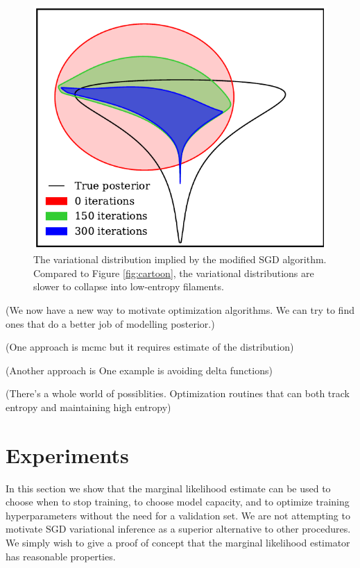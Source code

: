 \documentclass[]{article}
\begin{document}
\begin{figure}[h]
\vskip 0.2in
\begin{center}
\includegraphics[width=\columnwidth]{../experiments/2015_03_02_funnel/3_grad_threshold/dists.pdf}
\caption{The variational distribution implied by the modified SGD algorithm.
Compared to Figure \ref{fig:cartoon}, the variational distributions are slower to collapse into low-entropy filaments.}
\label{fig:cartoon-fatter}
\end{center}
\end{figure}

(We now have a new way to motivate optimization algorithms. We can try to find
ones that do a better job of modelling posterior.)

(One approach is mcmc but it requires estimate of the distribution)

(Another approach is One example is avoiding delta functions)

(There's a whole world of possiblities. Optimization routines that can both track
entropy and maintaining high entropy)





\section{Experiments}
\label{sec:experiments}

In this section we show that the marginal likelihood estimate can be used to choose when to stop training, to choose model capacity, and to optimize training hyperparameters without the need for a validation set.
We are not attempting to motivate SGD variational inference as a superior alternative to other procedures. 
We simply wish to give a proof of concept that the marginal likelihood estimator has reasonable properties.
\end{document}
